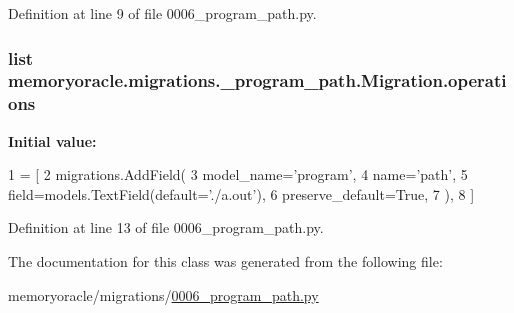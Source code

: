 Definition at line 9 of file 0006\+\_\+program\+\_\+path.\+py.

\hypertarget{classmemoryoracle_1_1migrations_1_10006__program__path_1_1Migration_a38e3e71ea04d783b45424eef8400e71a}{}
\subsubsection[{operations}]{\setlength{\rightskip}{0pt plus 5cm}list memoryoracle.\+migrations.\+\_\+program\+\_\+path.\+Migration.\+operations\hspace{0.3cm}{\ttfamily [static]}}\label{classmemoryoracle_1_1migrations_1_10006__program__path_1_1Migration_a38e3e71ea04d783b45424eef8400e71a}
{\bfseries Initial value\+:}
\begin{DoxyCode}
1 = [
2         migrations.AddField(
3             model\_name=\textcolor{stringliteral}{'program'},
4             name=\textcolor{stringliteral}{'path'},
5             field=models.TextField(default=\textcolor{stringliteral}{'./a.out'}),
6             preserve\_default=\textcolor{keyword}{True},
7         ),
8     ]
\end{DoxyCode}


Definition at line 13 of file 0006\+\_\+program\+\_\+path.\+py.



The documentation for this class was generated from the following file\+:\begin{DoxyCompactItemize}
\item 
memoryoracle/migrations/\hyperlink{0006__program__path_8py}{0006\+\_\+program\+\_\+path.\+py}\end{DoxyCompactItemize}
